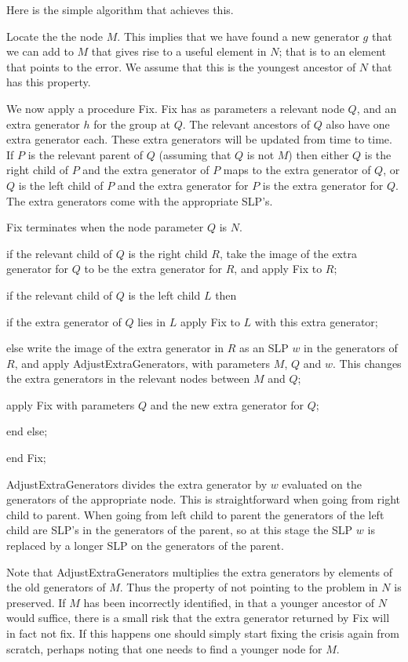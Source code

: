 Here is the simple algorithm that achieves this.

Locate the the node $M$.  This implies that we have found a new generator $g$ that we can
add to $M$ that gives rise to a useful element in $N$; that is to an element that points to the error.
We assume that this is the youngest ancestor of $N$ that has this property.

We now apply a procedure Fix.  Fix has as parameters a relevant node $Q$, and an extra
generator $h$ for the group at $Q$.  The relevant ancestors of $Q$ also have one extra generator
each.  These extra generators will be updated from time to time.  If $P$ is the relevant
parent of $Q$ (assuming that $Q$ is not $M$) then either $Q$ is the right child of $P$ and
the extra generator of $P$ maps to the extra generator of $Q$, or $Q$ is the left child of
$P$ and the extra generator for $P$ is the extra generator for $Q$.  The extra generators
come with the appropriate SLP's.

Fix terminates when the node parameter $Q$ is $N$.

if the relevant child of $Q$ is the right child $R$, take the image of the extra generator for
$Q$ to be the extra generator for $R$, and apply Fix to $R$;

if the relevant child of $Q$ is the left child $L$ then

if the extra generator of $Q$ lies in $L$ apply Fix to $L$ with this extra generator;

else write the image of the extra generator in $R$ as an SLP $w$ in the generators of $R$, and
apply AdjustExtraGenerators, with parameters $M$, $Q$ and $w$.  This changes the 
extra generators in the relevant nodes between $M$ and $Q$;

apply Fix with parameters $Q$ and the new extra generator for $Q$;

end else;

end Fix;

AdjustExtraGenerators divides the extra generator by $w$ evaluated on the generators of the 
appropriate node.  This is straightforward when going from right child to parent.
When going from left child to parent the generators of the left child are SLP's in the
generators of the parent, so at this stage the SLP $w$ is replaced by a longer SLP
on the generators of the parent.

Note that AdjustExtraGenerators multiplies the extra generators by elements of the
old generators of $M$.  Thus the property of not pointing to the problem in $N$
is preserved.  If $M$ has been incorrectly identified, in that a younger ancestor
of $N$ would suffice, there is a small risk that the extra generator returned by Fix
will in fact not fix.  If this happens one should simply start fixing the crisis again from
scratch, perhaps noting that one needs to find a younger node for $M$.

\bye
